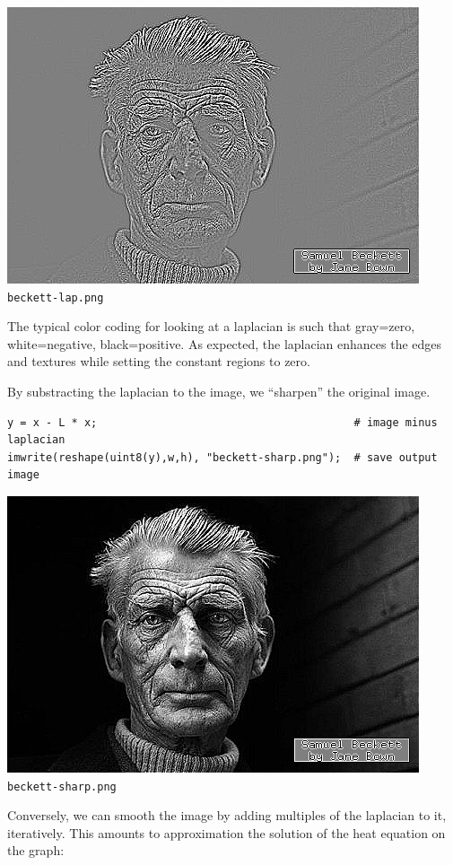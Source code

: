 \includegraphics{beckett-lap.png}
{\small\verb+beckett-lap.png+}

The typical color coding for looking at a laplacian is such that gray=zero,
white=negative, black=positive.  As expected, the laplacian enhances the
edges and textures while setting the constant regions to zero.

By substracting the laplacian to the image, we ``sharpen'' the original image.

\begin{verbatim}
y = x - L * x;                                        # image minus laplacian
imwrite(reshape(uint8(y),w,h), "beckett-sharp.png");  # save output image
\end{verbatim}

\includegraphics{beckett-sharp.png}
{\small\verb+beckett-sharp.png+}

Conversely, we can smooth the image by adding multiples of the laplacian to
it, iteratively.  This amounts to approximation the solution of the heat
equation on the graph:

